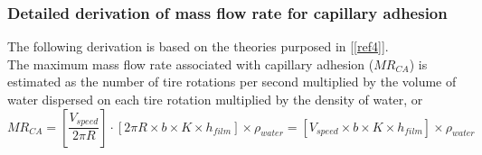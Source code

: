 \documentclass[12pt]{article}
\newcommand{\reref}[1]{\ref{#1}}
\begin{document}
\subsubsection*{Detailed derivation of mass flow rate for capillary adhesion}

The following derivation is based on the theories purposed in [\reref{ref4}].\\
The maximum mass flow rate associated with capillary adhesion ($\mathit{MR_{CA}}$) is estimated as the number of tire rotations per second multiplied by the volume of water dispersed on each tire rotation multiplied by the density of water, or
 \[ 
\mathit{MR_{CA}} = \left[\frac{V_{speed}}{2\pi R}\right] \cdot \left[ 2\pi R \times b \times K \times h_{film} \right] \times \rho_{water} = \left[V_{speed} \times b \times K \times h_{film} \right] \times  \rho_{water} 
\]
\\
\end{document}
